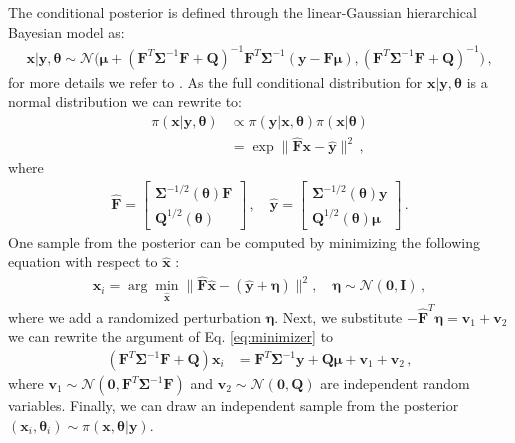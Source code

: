 The conditional posterior is defined through the linear-Gaussian hierarchical Bayesian model as: 
\begin{align}
    \bm{x}| \bm{y} , \bm{\theta} \sim \mathcal{N}\big( \bm{\mu} + (\bm{F}^T \bm{\Sigma}^{-1} \bm{F} + \bm{Q} )^{-1} \bm{F}^T \bm{\Sigma}^{-1} (\bm{y} - \bm{F} \bm{\mu}), (\bm{F}^T \bm{\Sigma}^{-1} \bm{F} + \bm{Q} )^{-1} \big) \, ,
\end{align}
for more details we refer to \cite{fox2016fast, higdon2006primer, simpson2012think}.
As the full conditional distribution for $\bm{x}| \bm{y} , \bm{\theta} $ is a normal distribution we can rewrite to:
\begin{align}
    \pi(\bm{x}|\bm{y}, \bm{\theta} ) &\propto \pi(\bm{y} | \bm{x} , \bm{\theta} ) \pi(\bm{x}| \bm{\theta}) \\
   &= \exp  \lVert \hat{\bm{F}} \bm{x} - \hat{\bm{y}} \rVert^2 \, ,
\end{align}
where 
\begin{align}
\label{eq:minimizer}
\hat{\bm{F}} = 
    \begin{bmatrix}
         \bm{\Sigma}^{-1/2}(\bm{\theta})  \bm{F}\\
    \bm{Q}^{1/2}(\bm{\theta}) 
    \end{bmatrix} \, , \quad \hat{\bm{y}} = 
    \begin{bmatrix}
        \bm{\Sigma}^{-1/2}(\bm{\theta})  \bm{y} \\
        \bm{Q}^{1/2}(\bm{\theta}) \bm{\mu}
    \end{bmatrix} \, .
\end{align}
One sample from the posterior can be computed by minimizing the following equation with respect to $\hat{\bm{x}}$ :
\begin{align}
    \bm{x}_i = \arg \min_{\hat{\bm{x}}} \lVert \hat{\bm{F}} \hat{\bm{x}} - ( \hat{\bm{y}} + \bm{\eta} ) \rVert^2 , \quad \bm{\eta} \sim \mathcal{N}(\bm{0}, \mathbf{I}) \, ,
\end{align}
where we add a randomized perturbation $\bm{\eta}$.
Next, we substitute $ - \hat{\bm{F}}^T  \bm{\eta}  = \bm{v}_1 + \bm{v}_2$ we can rewrite the argument of Eq. \ref{eq:minimizer} to 
\begin{align}
\label{eq:RTO}
    (\bm{F}^T \bm{\Sigma}^{-1} \bm{F}+
    \bm{Q} ) \bm{x}_i &= \bm{F}^T \bm{\Sigma}^{-1} \bm{y} +  \bm{Q} \bm{\mu} + \bm{v}_1 + \bm{v}_2 \,  ,
\end{align}
where $\bm{v}_1 \sim \mathcal{N}(\bm{0}, \bm{F}^T \bm{\Sigma}^{-1} \bm{F}) $ and $\bm{v}_2 \sim \mathcal{N}(\bm{0}, \bm{Q} )$ are independent random variables.
Finally, we can draw an independent sample from the posterior $(\bm{x}_i, \bm{\theta}_i) \sim \pi(\bm{x}, \bm{\theta} | \bm{y})$.
    
